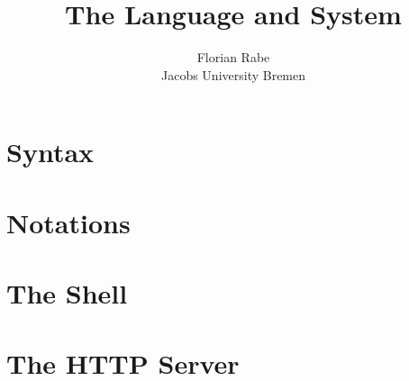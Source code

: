\documentclass{article}
\title{The {\mmt} Language and System}
\author{Florian Rabe \\
Jacobs University Bremen}
\begin{document}
\maketitle


\section{Syntax}\label{sec:syntax}


\section{Notations}\label{sec:notations}


\section{The Shell}\label{sec:shell}


\section{The HTTP Server}\label{sec:http}





\end{document}
